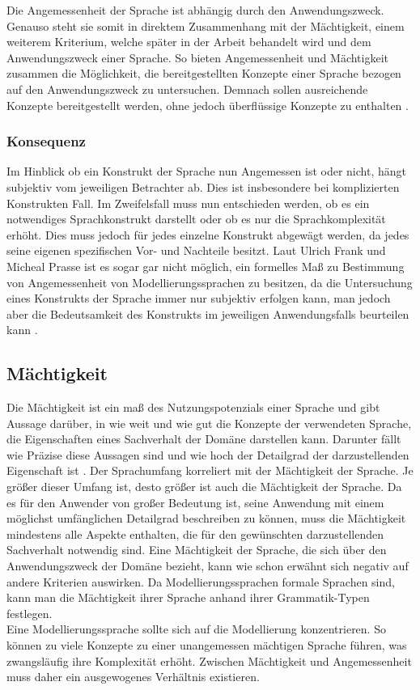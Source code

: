 Die Angemessenheit der Sprache ist abhängig durch den Anwendungszweck.
Genauso steht sie somit in direktem Zusammenhang mit der Mächtigkeit, einem weiterem Kriterium, welche später in der Arbeit behandelt wird und dem Anwendungszweck einer Sprache. 
So bieten Angemessenheit und Mächtigkeit zusammen die Möglichkeit, die bereitgestellten Konzepte einer Sprache bezogen auf den Anwendungszweck zu untersuchen. Demnach sollen ausreichende Konzepte bereitgestellt werden, ohne jedoch überflüssige Konzepte zu enthalten \cite[35]{Frank_1997}.

\subsubsection{Konsequenz}
Im Hinblick ob ein Konstrukt der Sprache nun Angemessen ist oder nicht, hängt subjektiv vom jeweiligen Betrachter ab. 
Dies ist insbesondere bei komplizierten Konstrukten Fall. Im Zweifelsfall muss nun entschieden werden, ob es ein notwendiges Sprachkonstrukt darstellt oder ob es nur die Sprachkomplexität erhöht. Dies muss jedoch für jedes einzelne Konstrukt abgewägt werden, da jedes seine eigenen spezifischen Vor- und Nachteile besitzt. Laut Ulrich Frank und Micheal Prasse ist es sogar gar nicht möglich, ein formelles Maß zu Bestimmung von Angemessenheit von Modellierungssprachen zu besitzen, da die Untersuchung eines Konstrukts der Sprache immer nur subjektiv erfolgen kann, man jedoch aber die Bedeutsamkeit des Konstrukts im jeweiligen Anwendungsfalls beurteilen kann \cite[35]{Frank_1997}.

\subsection{Mächtigkeit}
\label{ssc:Nutzungspotenzial}
Die Mächtigkeit ist ein maß des Nutzungspotenzials einer Sprache und gibt Aussage darüber,
in wie weit und wie gut die Konzepte der verwendeten Sprache, die Eigenschaften eines Sachverhalt der Domäne darstellen kann.
Darunter fällt wie Präzise diese Aussagen sind und wie hoch der Detailgrad der darzustellenden Eigenschaft ist \cite[180]{Allweyer_2005}.
Der Sprachumfang korreliert mit der Mächtigkeit der Sprache. Je größer dieser Umfang ist, desto größer ist auch die Mächtigkeit der Sprache.
Da es für den Anwender von großer Bedeutung ist, seine Anwendung mit einem möglichst umfänglichen Detailgrad beschreiben zu können,
muss die Mächtigkeit mindestens alle Aspekte enthalten, die für den gewünschten darzustellenden Sachverhalt notwendig sind.
Eine Mächtigkeit der Sprache, die sich über den Anwendungszweck der Domäne bezieht, kann wie schon erwähnt sich negativ auf andere Kriterien auswirken.
Da Modellierungssprachen formale Sprachen sind, kann man die Mächtigkeit ihrer Sprache anhand ihrer Grammatik-Typen festlegen. \\
Eine Modellierungssprache sollte sich auf die Modellierung konzentrieren.
So können zu viele Konzepte zu einer unangemessen mächtigen Sprache führen, was zwangsläufig ihre Komplexität erhöht. Zwischen Mächtigkeit
und Angemessenheit muss daher ein ausgewogenes Verhältnis existieren.

